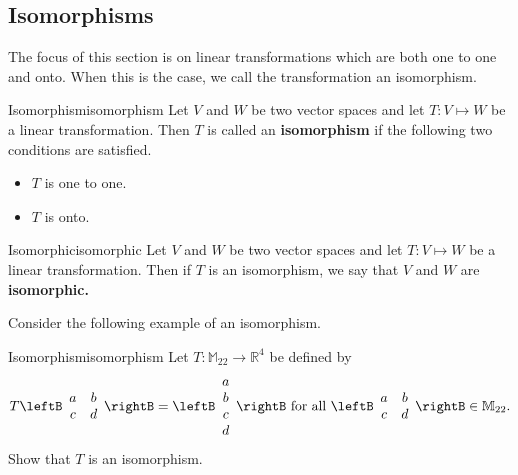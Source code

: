 \subsection{Isomorphisms}

The focus of this section is on linear transformations which are both one to one and onto. When this is the case, we call the transformation an isomorphism.

\begin{definition}{Isomorphism}{isomorphism}
Let $V$ and $W$ be two vector spaces and let $T: V \mapsto W$ be a linear transformation. 
Then $T$ is called an \textbf{isomorphism} 
if the following two conditions are satisfied.

\begin{itemize}
\item $T$ is one to one. 

\item $T$ is onto.
\end{itemize}
\end{definition}

\begin{definition}{Isomorphic}{isomorphic}
Let $V$ and $W$ be two vector spaces and let $T: V \mapsto W$ be a linear transformation. 
Then if $T$ is an isomorphism, we say that $V$ and $W$ are \textbf{isomorphic.}
\end{definition}

Consider the following example of an isomorphism.

\begin{example}{Isomorphism}{isomorphism}
Let $T:\mathbb{M}_{22}\to\mathbb{R}^4$ be defined by
\[
T\leftB\begin{array}{cc} a & b \\ c & d \end{array}\rightB
=\leftB\begin{array}{c} a\\ b\\ c \\ d \end{array}\rightB
\mbox{ for all }
\leftB\begin{array}{cc} a & b \\ c & d \end{array}\rightB
\in\mathbb{M}_{22}. \]
Show that $T$ is an isomorphism.
\end{example}

